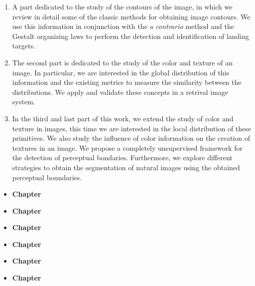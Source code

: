 \begin{enumerate}
	\item A part dedicated to the study of the contours of the image, in which we review in detail some of the classic methods for obtaining image contours. We use this information in conjunction with the \textit{a contrario} method and the Gestalt organizing laws to perform the detection and identification of landing targets.
	\item The second part is dedicated to the study of the color and texture of an image. In particular, we are interested in the global distribution of this information and the existing metrics to measure the similarity between the distributions. We apply and validate these concepts in a retrival image system.
	\item In the third and last part of this work, we extend the study of color and texture in images, this time we are interested in the local distribution of these primitives. We also study the influence of color information on the creation of textures in an image. We propose a completely unsupervised framework for the detection of perceptual bondaries. Furthermore, we explore different strategies to obtain the segmentation of natural images using the obtained perceptual boundaries.
\end{enumerate}

\begin{itemize}
	\item \textbf{Chapter}
	\item \textbf{Chapter}
	\item \textbf{Chapter}
	\item \textbf{Chapter}
	\item \textbf{Chapter}
	\item \textbf{Chapter}	
\end{itemize}
